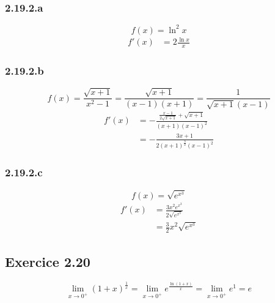 \documentclass[a4paper,10pt]{report}
\begin{document}
\subsubsection*{2.19.2.a}
\begin{displaymath}
	f(x) = \ln^2 x
\end{displaymath}
\begin{equation*}
	\begin{split}
		f'(x) &= 2\frac{\ln x}{x}
	\end{split}	
\end{equation*}

\subsubsection*{2.19.2.b}
\begin{displaymath}
	f(x) = \frac{\sqrt{x+1}}{x^2-1} = \frac{\sqrt{x+1}}{(x-1)(x+1)}= \frac{1}{\sqrt{x+1}(x-1)}
\end{displaymath}
\begin{equation*}
	\begin{split}
		f'(x) &= -\frac{\frac{x-1}{2\sqrt{x+1}} + \sqrt{x+1}}{(x+1)(x-1)^2} \\
		      & = -\frac{3x+1}{2(x+1)^{\frac{3}{2}} (x-1)^2}
	\end{split}	
\end{equation*}

\subsubsection*{2.19.2.c}
\begin{displaymath}
	f(x) = \sqrt{e^{x^3}}
\end{displaymath}
\begin{equation*}
	\begin{split}
		f'(x) &= \frac{3x^2 e^{x^3}}{2\sqrt{e^{x^3}}} \\
		      &= \frac{3}{2}x^2 \sqrt{e^{x^3}}
	\end{split}	
\end{equation*}


\subsection*{Exercice 2.20}
\begin{displaymath}
	\lim_{x \rightarrow 0^{+}} (1+x)^\frac{1}{x}
		= \lim_{x \rightarrow 0^{+}} e^{\frac{\ln(1+x)}{x}}
		= \lim_{x \rightarrow 0^{+}} e^{1} 
		= e
\end{displaymath}
\end{document}
